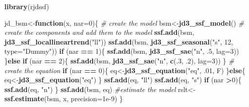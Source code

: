 \documentclass[]{article}
\newenvironment{Shaded}{\begin{snugshade}}{\end{snugshade}}
\newcommand{\KeywordTok}[1]{\textcolor[rgb]{0.13,0.29,0.53}{\textbf{#1}}}
\newcommand{\DataTypeTok}[1]{\textcolor[rgb]{0.13,0.29,0.53}{#1}}
\newcommand{\DecValTok}[1]{\textcolor[rgb]{0.00,0.00,0.81}{#1}}
\newcommand{\FloatTok}[1]{\textcolor[rgb]{0.00,0.00,0.81}{#1}}
\newcommand{\StringTok}[1]{\textcolor[rgb]{0.31,0.60,0.02}{#1}}
\newcommand{\CommentTok}[1]{\textcolor[rgb]{0.56,0.35,0.01}{\textit{#1}}}
\newcommand{\ControlFlowTok}[1]{\textcolor[rgb]{0.13,0.29,0.53}{\textbf{#1}}}
\newcommand{\OperatorTok}[1]{\textcolor[rgb]{0.81,0.36,0.00}{\textbf{#1}}}
\newcommand{\NormalTok}[1]{#1}
\begin{document}
\begin{Shaded}
\begin{Highlighting}[]
\KeywordTok{library}\NormalTok{(rjdssf)}

\NormalTok{jd_bsm<-}\ControlFlowTok{function}\NormalTok{(x, }\DataTypeTok{nar=}\DecValTok{0}\NormalTok{)\{}
  \CommentTok{# create the model}
\NormalTok{  bsm<-}\KeywordTok{jd3_ssf_model}\NormalTok{()}
  \CommentTok{# create the components and add them to the model}
  \KeywordTok{ssf.add}\NormalTok{(bsm, }\KeywordTok{jd3_ssf_locallineartrend}\NormalTok{(}\StringTok{"ll"}\NormalTok{))}
  \KeywordTok{ssf.add}\NormalTok{(bsm, }\KeywordTok{jd3_ssf_seasonal}\NormalTok{(}\StringTok{"s"}\NormalTok{, }\DecValTok{12}\NormalTok{, }\DataTypeTok{type=}\StringTok{"Dummy"}\NormalTok{))}
  \ControlFlowTok{if}\NormalTok{ (nar }\OperatorTok{==}\StringTok{ }\DecValTok{1}\NormalTok{)\{}
    \KeywordTok{ssf.add}\NormalTok{(bsm, }\KeywordTok{jd3_ssf_sae}\NormalTok{(}\StringTok{"n"}\NormalTok{, .}\DecValTok{5}\NormalTok{, }\DataTypeTok{lag=}\DecValTok{3}\NormalTok{))}
\NormalTok{  \}}\ControlFlowTok{else} \ControlFlowTok{if}\NormalTok{ (nar }\OperatorTok{==}\StringTok{ }\DecValTok{2}\NormalTok{)\{}
    \KeywordTok{ssf.add}\NormalTok{(bsm, }\KeywordTok{jd3_ssf_sae}\NormalTok{(}\StringTok{"n"}\NormalTok{, }\KeywordTok{c}\NormalTok{(.}\DecValTok{3}\NormalTok{, .}\DecValTok{2}\NormalTok{), }\DataTypeTok{lag=}\DecValTok{3}\NormalTok{))}
\NormalTok{  \}}
  \CommentTok{# create the equation }
  \ControlFlowTok{if}\NormalTok{ (nar }\OperatorTok{==}\StringTok{ }\DecValTok{0}\NormalTok{)\{}
\NormalTok{    eq<-}\KeywordTok{jd3_ssf_equation}\NormalTok{(}\StringTok{"eq"}\NormalTok{, .}\DecValTok{01}\NormalTok{, F)}
\NormalTok{  \}}\ControlFlowTok{else}\NormalTok{\{}
\NormalTok{    eq<-}\KeywordTok{jd3_ssf_equation}\NormalTok{(}\StringTok{"eq"}\NormalTok{)}
\NormalTok{  \}}
  \KeywordTok{ssf.add}\NormalTok{(eq, }\StringTok{"ll"}\NormalTok{)}
  \KeywordTok{ssf.add}\NormalTok{(eq, }\StringTok{"s"}\NormalTok{)}
  \ControlFlowTok{if}\NormalTok{ (nar }\OperatorTok{>}\DecValTok{0}\NormalTok{)\{}
    \KeywordTok{ssf.add}\NormalTok{(eq, }\StringTok{"n"}\NormalTok{)}
\NormalTok{  \}}
  \KeywordTok{ssf.add}\NormalTok{(bsm, eq)}
  \CommentTok{#estimate the model}
\NormalTok{  rslt<-}\KeywordTok{ssf.estimate}\NormalTok{(bsm, x, }\DataTypeTok{precision=}\FloatTok{1e-9}\NormalTok{)}
\NormalTok{\}}


\end{Highlighting}
\end{Shaded}
\end{document}
